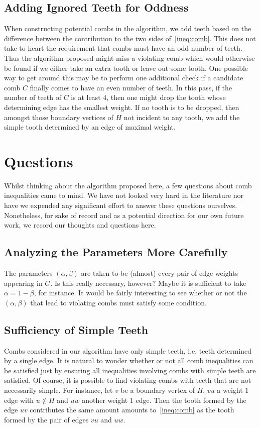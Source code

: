\documentclass[12pt, letterpaper]{amsart}
\theoremstyle{plain}
\theoremstyle{definition}
\theoremstyle{remark}
\begin{document}
\subsection{Adding Ignored Teeth for Oddness}
When constructing potential combs in the algorithm, we add teeth based on the
difference between the contribution to the two sides of~\eqref{ineq:comb}. This
does not take to heart the requirement that combs must have an odd number of
teeth.  Thus the algorithm proposed might miss a violating comb which would
otherwise be found if we either take an extra tooth or leave out some tooth.
One possible way to get around this may be to perform one additional check if a
candidate comb $C$ finally comes to have an even number of teeth. In this pass,
if the number of teeth of $C$ is at least $4$, then one might drop the tooth
whose determining edge has the smallest weight. If no tooth is to be dropped,
then amongst those boundary vertices of $H$ not incident to any tooth, we add
the simple tooth determined by an edge of maximal weight.

\section{Questions}\label{sec:questions}
Whilst thinking about the algorithm proposed here, a few questions about comb
inequalities came to mind. We have not looked very hard in the literature nor
have we expended any significant effort to answer these questions ourselves.
Nonetheless, for sake of record and as a potential direction for our own future
work, we record our thoughts and questions here.

\subsection{Analyzing the Parameters More Carefully}
The parameters $(\alpha,\beta)$ are taken to be (almost) every pair of edge
weights appearing in $G$. Is this really necessary, however?  Maybe it is
sufficient to take $\alpha = 1 - \beta$, for instance. It would be fairly
interesting to see whether or not the $(\alpha,\beta)$ that lead to violating
combs must satisfy some condition.

\subsection{Sufficiency of Simple Teeth}
Combs considered in our algorithm have only simple teeth, i.e. teeth determined
by a single edge. It is natural to wonder whether or not all comb inequalities
can be satisfied just by ensuring all inequalities involving combs with simple
teeth are satisfied. Of course, it is possible to find violating combs with
teeth that are not necessarily simple. For instance, let $v$ be a boundary
vertex of $H$, $vu$ a weight $1$ edge with $u \notin H$ and $uw$ another weight
$1$ edge. Then the tooth formed by the edge $uv$ contributes the same amount
amounts to~\eqref{ineq:comb} as the tooth formed by the pair of edges $vu$ and
$uw$.
\end{document}
